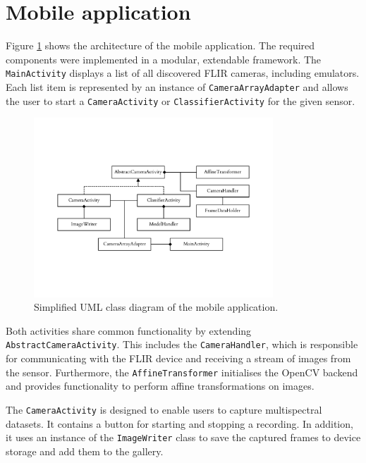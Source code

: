 \documentclass{l4proj}
\begin{document}


\section{Mobile application}

Figure \ref{fig:app_uml} shows the architecture of the mobile application. The required components were implemented in a modular, extendable framework. The \lstinline{MainActivity} displays a list of all discovered FLIR cameras, including emulators. Each list item is represented by an instance of \lstinline{CameraArrayAdapter} and allows the user to start a \lstinline{CameraActivity} or \lstinline{ClassifierActivity} for the given sensor. 

\begin{figure}[ht]
  \centering
  \includegraphics[width=0.8\textwidth, trim={2.5cm 4.5cm 2.5cm 4.5cm}, clip=true]{images/app/App_UML}
  \caption{Simplified UML class diagram of the mobile application.}
  \label{fig:app_uml}
\end{figure}

Both activities share common functionality by extending \lstinline{AbstractCameraActivity}. This includes the \lstinline{CameraHandler}, which is responsible for communicating with the FLIR device and receiving a stream of images from the sensor. Furthermore, the \lstinline{AffineTransformer} initialises the OpenCV backend and provides functionality to perform affine transformations on images.

The \lstinline{CameraActivity} is designed to enable users to capture multispectral datasets. It contains a button for starting and stopping a recording. In addition, it uses an instance of the \lstinline{ImageWriter} class to save the captured frames to device storage and add them to the gallery.
\end{document}
